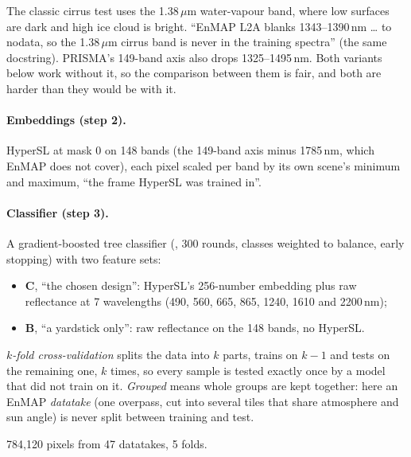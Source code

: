 \begin{sourcenote}
The classic cirrus test uses the 1.38\,$\mu$m water-vapour band, where low surfaces are dark and high ice cloud is bright.
``EnMAP L2A blanks 1343--1390\,nm \dots{} to nodata, so the 1.38\,$\mu$m cirrus band is never in the training spectra''
(the same docstring). PRISMA's 149-band axis also drops 1325--1495\,nm. Both variants below work without it, so the
comparison between them is fair, and both are harder than they would be with it.
\end{sourcenote}

\paragraph{Embeddings (step 2).} HyperSL at mask 0 on 148 bands (the 149-band axis minus 1785\,nm, which EnMAP does not
cover), each pixel scaled per band by its own scene's minimum and maximum, ``the frame HyperSL was trained in''.

\paragraph{Classifier (step 3).} A gradient-boosted tree classifier (, 300 rounds,
classes weighted to balance, early stopping) with two feature sets:
\begin{itemize}
\item \textbf{C}, ``the chosen design'': HyperSL's 256-number embedding plus raw reflectance at 7 wavelengths (490, 560,
665, 865, 1240, 1610 and 2200\,nm);
\item \textbf{B}, ``a yardstick only'': raw reflectance on the 148 bands, no HyperSL.
\end{itemize}

\begin{definition}
\emph{$k$-fold cross-validation} splits the data into $k$ parts, trains on $k-1$ and tests on the
remaining one, $k$ times, so every sample is tested exactly once by a model that did not train on it. \emph{Grouped}
means whole groups are kept together: here an EnMAP \emph{datatake} (one overpass, cut into several tiles that share
atmosphere and sun angle) is never split between training and test.
\end{definition}
784,120 pixels from 47 datatakes, 5 folds\tbrk{}.

